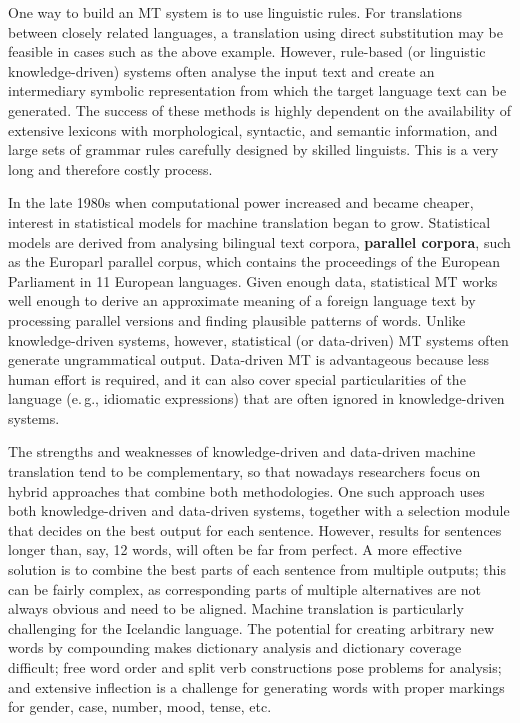 \documentclass{../../metanetpaper}
\begin{document}
\begin{multicols}{2}
One way to build an MT system is to use linguistic rules. For translations between closely related languages, a translation using direct substitution may be feasible in cases such as the above example. However, rule-based (or linguistic knowledge-driven) systems often analyse the input text and create an intermediary symbolic representation from which the target language text can be generated. The success of these methods is highly dependent on the availability of extensive lexicons with morphological, syntactic, and semantic information, and large sets of grammar rules carefully designed by skilled linguists. This is a very long and therefore costly process.

In the late 1980s when computational power increased and became cheaper, interest in statistical models for machine translation began to grow. Statistical models are derived from analysing bilingual text corpora, \textbf{parallel corpora}, such as the Europarl parallel corpus, which contains the proceedings of the European Parliament in 11 European languages. Given enough data, statistical MT works well enough to derive an approximate meaning of a foreign language text by processing parallel versions and finding plausible patterns of words. Unlike knowledge-driven systems, however, statistical (or data-driven) MT systems often generate ungrammatical output. Data-driven MT is advantageous because less human effort is required, and it can also cover special particularities of the language (e.\,g., idiomatic expressions) that are often ignored in knowledge-driven systems. 

The strengths and weaknesses of knowledge-driven and data-driven machine translation tend to be complementary, so that nowadays researchers focus on hybrid approaches that combine both methodologies. One such approach uses both knowledge-driven and data-driven systems, together with a selection module that decides on the best output for each sentence. However, results for sentences longer than, say, 12 words, will often be far from perfect. A more effective solution is to combine the best parts of each sentence from multiple outputs; this can be fairly complex, as corresponding parts of multiple alternatives are not always obvious and need to be aligned. 
Machine translation is particularly challenging for the Icelandic language. The potential for creating arbitrary new words by compounding makes dictionary analysis and dictionary coverage difficult; free word order and split verb constructions pose problems for analysis; and extensive inflection is a challenge for generating words with proper markings for gender, case, number, mood, tense, etc.


\end{multicols}
\end{document}
